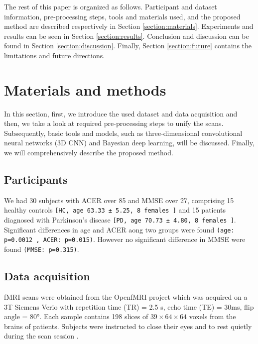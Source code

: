 \documentclass[preprint,12pt]{elsarticle}
\begin{document}
The rest of this paper is organized as follows. Participant and dataset information, pre-processing steps, tools and materials used, and the proposed method are described respectively in Section \ref{section:materials}. Experiments and results can be seen in Section \ref{section:results}. Conclusion and discussion can be found in Section \ref{section:discussion}. Finally, Section \ref{section:future} contains the limitations and future directions.



\section{Materials and methods}

In this section, first, we introduce the used dataset and data acquisition and then, we take a look at required pre-processing steps to unify the scans. Subsequently, basic tools and models, such as three-dimensional convolutional neural networks (3D CNN) and Bayesian deep learning, will be discussed. Finally, we will comprehensively describe the proposed method.

\label{section:materials}





\subsection{Participants}
\label{section:participants}
We had 30 subjects with ACER over 85 and MMSE over 27, comprising 15 healthy controls \texttt{[HC, age 63.33 ± 5.25, 8 females ]}
and 15 patients diagnosed with Parkinson's disease  \texttt{[PD, age 70.73 ± 4.80, 8 females ]}.
Significant differences in age and ACER aong two groups were found \texttt{(age: p=0.0012 , ACER: p=0.015)}. However no significant difference in MMSE were found \texttt{(MMSE: p=0.315)}.

\subsection{Data acquisition}
\label{section:data}
fMRI scans were obtained from the OpenfMRI project which was acquired on a 3T Siemens Verio with repetition time (TR) = 2.5 s, echo time (TE) = 30ms, flip angle = 80°. Each sample contains 198 slices of $39 \times 64 \times 64$ voxels from the brains of patients. Subjects were instructed to close their eyes and to rest quietly during the scan session \cite{OpenFmri}.
\end{document}
